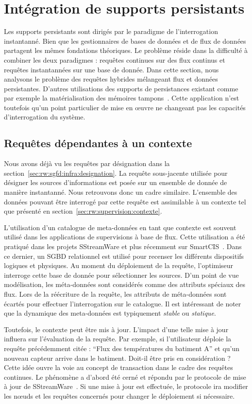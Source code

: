 \section{Intégration de supports persistants}\label{sec:rw:sgfd:persistance}
Les supports persistants sont dirigés par le paradigme de l'interrogation instantanné. Bien que les gestionnaires de bases de données et de flux de données partagent les mêmes fondations théoriques. Le problème réside dans la difficulté à combiner les deux paradigmes : requêtes continues sur des flux continus et requêtes instantannées sur une base de donnée. Dans cette section, nous analysons le problème des requêtes hybrides mélangeant flux et données persistantes. D'autres utilisations des supports de persistances existant comme par exemple la matérialisation des mémoires tampons~\cite{Abadi:aurora}. Cette application n'est toutefois qu'un point particulier de mise en œuvre ne changeant pas les capacités d'interrogation du système.

\subsection{Requêtes dépendantes à un contexte}
Nous avons déjà vu les requêtes par désignation dans la section~\ref{sec:rw:sgfd:infra:designation}. La requête sous-jacente utilisée pour désigner les sources d'informations est posée sur un ensemble de donnée de manière instantanné. Nous retrouvons donc un cadre similaire. L'ensemble des données pouvant être interrogé par cette requête est assimilable à un contexte tel que présenté en section~\ref{sec:rw:supervision:contexte}.

L'utilisation d'un catalogue de meta-données en tant que contexte est souvent utilisé dans les applications de supervisions à base de flux. Cette utilisation a été pratiqué dans les projets SStreamWare et plus récemment sur SmartCIS~\cite{Liu:smartcis}. Dans ce dernier, un SGBD relationnel est utilisé pour recenser les différents dispositifs logiques et physiques. Au moment du déploiement de la requête, l'optimiseur interroge cette base de donnée pour sélectionner les sources. D'un point de vue modélisation, les méta-données sont considérés comme des attributs spéciaux des flux. Lors de la réécriture de la requête, les attributs de méta-données sont écartés pour effectuer l'interrogation sur le catalogue. Il est intéressant de noter que la dynamique des meta-données est typiquement \textit{stable} ou \textit{statique}.

Toutefois, le contexte peut être mis à jour. L'impact d'une telle mise à jour influera sur l'évaluation de la requête. Par exemple, si l'utilisateur déploie la requête précédemment citée : \enquote{Flux des températures du batiment A} et qu'un nouveau capteur arrive dans le batiment. Doit-il être pris en considération ? Cette idée ouvre la voie au concept de transaction dans le cadre des requêtes continues. Le phénomène a d'abord été cerné et répondu par le protocole de mise à jour de SStreamWare~\cite{Gurgen:transaction}. Si une mise à jour est effectuée, le protocole ira modifier les nœuds et les requêtes concernés pour changer le déploiement si nécessaire.

